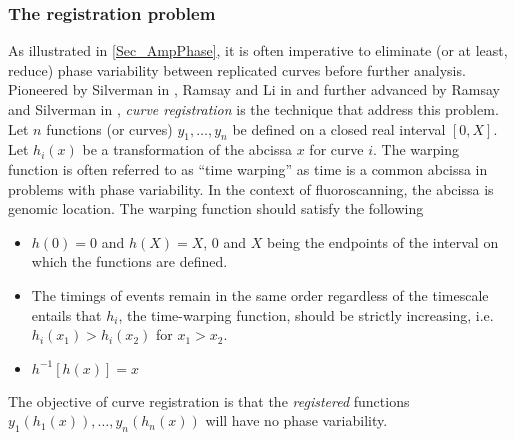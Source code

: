 \subsubsection{The registration problem}
As illustrated in \ref{Sec_AmpPhase}, it is often imperative to eliminate (or at least, reduce) phase variability between  replicated curves before further analysis. Pioneered by Silverman in \cite{Silverman_1995_JRSSB}, Ramsay and Li in \cite{Ramsay_Li_1998_JRSSB} and further advanced by Ramsay and Silverman in \cite{Ramsay_2006_Functional}, {\emph{curve registration}} is the technique that address this problem. Let $n$ functions (or curves) $y_1, \dots, y_n$ be defined on a closed real interval $[0, X]$. Let $h_i(x)$ be a transformation of the abcissa $x$ for curve $i$. The warping function is often referred to as ``time warping'' as time is a common abcissa in problems with phase variability. In the context of fluoroscanning, the abcissa is genomic location. The warping function should satisfy the following
\begin{itemize}
\item $h(0) = 0$ and $h(X) = X$, $0$ and $X$ being the endpoints of the interval on which the functions are defined.
\item The timings of events remain in the same order regardless of the timescale entails that $h_i$, the time-warping function, should be strictly increasing, i.e. $h_i(x_1) > h_i(x_2)$ for $x_1 > x_2$. 
\item $h^{-1}[h(x)] = x$
\end{itemize}
The objective of curve registration is that the {\emph{registered}} functions $y_1(h_1(x)), \dots, y_n(h_n(x))$ will have no phase variability. 


